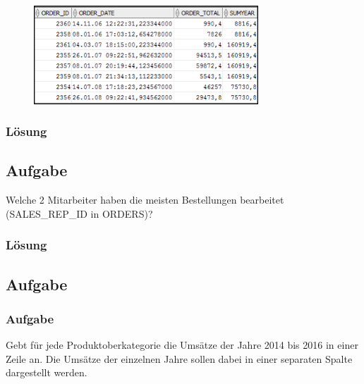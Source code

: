 \begin{figure}[H]
  \centering
  \includegraphics[width=0.75\textwidth]{img//uebung_12_-_aufgabe_07.png}
  \label{img:uebung_12_-_aufgabe_07}
\end{figure}

\subsubsection*{Lösung}
\label{subsubsec:uebung_12.aufgabe_07.loesung}


\subsection{Aufgabe}
\label{subsec:uebung_12.aufgabe_08}
Welche 2 Mitarbeiter haben die meisten Bestellungen bearbeitet (SALES\_REP\_ID in ORDERS)?

\subsubsection*{Lösung}
\label{subsubsec:uebung_12.aufgabe_08.loesung}


\subsection{Aufgabe}
\label{subsec:uebung_12.aufgabe_09}

\subsubsection{Aufgabe}
\label{subsec:uebung_12.aufgabe_09a}
Gebt für jede Produktoberkategorie die Umsätze der Jahre 2014 bis 2016 in einer Zeile an. Die Umsätze der einzelnen Jahre sollen dabei in einer separaten Spalte dargestellt werden.

